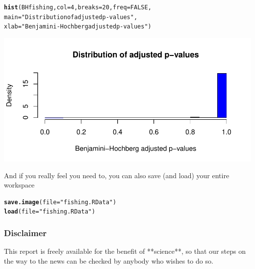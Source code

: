 \documentclass{article}\usepackage[]{graphicx}\usepackage[]{color}
\makeatletter
\def\maxwidth{ %
  \ifdim\Gin@nat@width>\linewidth
    \linewidth
  \else
    \Gin@nat@width
  \fi
}
\newcommand{\hlnum}[1]{\textcolor[rgb]{0.686,0.059,0.569}{#1}}%
\newcommand{\hlstr}[1]{\textcolor[rgb]{0.192,0.494,0.8}{#1}}%
\newcommand{\hlstd}[1]{\textcolor[rgb]{0.345,0.345,0.345}{#1}}%
\newcommand{\hlkwc}[1]{\textcolor[rgb]{0.333,0.667,0.333}{#1}}%
\newcommand{\hlkwd}[1]{\textcolor[rgb]{0.737,0.353,0.396}{\textbf{#1}}}%
\newenvironment{kframe}{%
 \def\at@end@of@kframe{}%
 \ifinner\ifhmode%
  \def\at@end@of@kframe{\end{minipage}}%
  \begin{minipage}{\columnwidth}%
 \fi\fi%
 \def\FrameCommand##1{\hskip\@totalleftmargin \hskip-\fboxsep
 \colorbox{shadecolor}{##1}\hskip-\fboxsep
     \hskip-\linewidth \hskip-\@totalleftmargin \hskip\columnwidth}%
 \MakeFramed {\advance\hsize-\width
   \@totalleftmargin\z@ \linewidth\hsize
   \@setminipage}}%
 {\par\unskip\endMakeFramed%
 \at@end@of@kframe}
\newenvironment{knitrout}{}{} %
\makeatother
\begin{document}
\begin{knitrout}
\color{fgcolor}\begin{kframe}
\begin{alltt}
\hlkwd{hist}\hlstd{(BHfishing,} \hlkwc{col}\hlstd{=}\hlnum{4}\hlstd{,} \hlkwc{breaks}\hlstd{=}\hlnum{20}\hlstd{,} \hlkwc{freq}\hlstd{=}\hlnum{FALSE}\hlstd{,}
     \hlkwc{main}\hlstd{=}\hlstr{"Distribution of adjusted p-values"}\hlstd{,}
     \hlkwc{xlab}\hlstd{=}\hlstr{"Benjamini-Hochberg adjusted p-values"}\hlstd{)}
\end{alltt}
\end{kframe}
\includegraphics[width=\maxwidth]{figure/rFigBHfishing} 

\end{knitrout}


And if you really feel you need to, you can also save (and load) your entire workspace
\begin{knitrout}
\color{fgcolor}\begin{kframe}
\begin{alltt}
\hlkwd{save.image}\hlstd{(}\hlkwc{file} \hlstd{=} \hlstr{"fishing.RData"}\hlstd{)}
\hlkwd{load}\hlstd{(}\hlkwc{file} \hlstd{=} \hlstr{"fishing.RData"}\hlstd{)}
\end{alltt}
\end{kframe}
\end{knitrout}


\subsubsection*{Disclaimer}
This report is freely available for the benefit of **science**, so that our steps on the way to the news can be checked by anybody who wishes to do so.
\end{document}
